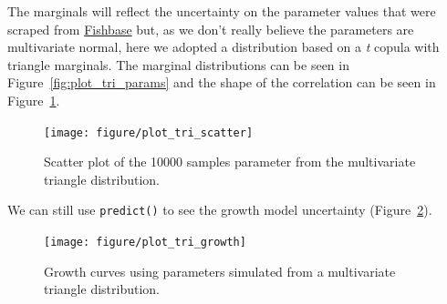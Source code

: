 \documentclass[a4paper,english,10pt]{article}\usepackage[]{graphicx}\usepackage[]{color}
\makeatletter
\newenvironment{kframe}{%
 \def\at@end@of@kframe{}%
 \ifinner\ifhmode%
  \def\at@end@of@kframe{\end{minipage}}%
  \begin{minipage}{\columnwidth}%
 \fi\fi%
 \def\FrameCommand##1{\hskip\@totalleftmargin \hskip-\fboxsep
 \colorbox{shadecolor}{##1}\hskip-\fboxsep
     \hskip-\linewidth \hskip-\@totalleftmargin \hskip\columnwidth}%
 \MakeFramed {\advance\hsize-\width
   \@totalleftmargin\z@ \linewidth\hsize
   \@setminipage}}%
 {\par\unskip\endMakeFramed%
 \at@end@of@kframe}
\newenvironment{knitrout}{}{} %
\newcommand{\code}[1]{{\texttt{#1}}}
\makeatother
\begin{document}
The marginals will reflect the uncertainty on the parameter values that were scraped from \href{http://fishbase.org}{Fishbase} but, as we don't really believe the parameters are multivariate normal, here we adopted a distribution based on a \emph{t} copula with triangle marginals.
The marginal distributions can be seen in Figure~\ref{fig:plot_tri_params} and the shape of the correlation can be seen in Figure~\ref{fig:plot_tri_scatter}.

\begin{knitrout}
\color{fgcolor}\begin{kframe}


{\ttfamily\noindent\bfseries\color{errorcolor}{\#\# Error: invalid number of 'breaks'}}

{\ttfamily\noindent\bfseries\color{errorcolor}{\#\# Error: invalid number of 'breaks'}}

{\ttfamily\noindent\bfseries\color{errorcolor}{\#\# Error: invalid number of 'breaks'}}\end{kframe}
\end{knitrout}

\begin{knitrout}
\color{fgcolor}\begin{kframe}


{\ttfamily\noindent\bfseries\color{errorcolor}{\#\# Error: Viewport 'plot\_01.panel.1.1.off.vp' was not found}}\end{kframe}\begin{figure}[H]


{\centering \texttt{[image: figure/plot\_tri\_scatter]} 

}

\caption[Scatter plot of the 10000 samples parameter from the multivariate triangle distribution]{Scatter plot of the 10000 samples parameter from the multivariate triangle distribution.\label{fig:plot_tri_scatter}}
\end{figure}


\end{knitrout}

We can still use \code{predict()} to see the growth model uncertainty (Figure~\ref{fig:plot_tri_growth}).

\begin{knitrout}
\color{fgcolor}\begin{kframe}


{\ttfamily\noindent\bfseries\color{errorcolor}{\#\# Error: need finite 'ylim' values}}\end{kframe}\begin{figure}[H]


{\centering \texttt{[image: figure/plot\_tri\_growth]} 

}

\caption[Growth curves using parameters simulated from a multivariate triangle distribution]{Growth curves using parameters simulated from a multivariate triangle distribution.\label{fig:plot_tri_growth}}
\end{figure}


\end{knitrout}
\end{document}

